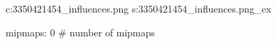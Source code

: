 c:3350421454\textures\hexer_influences.png
s:3350421454\textures\hexer_influences.png_ex

mipmaps: 0  # number of mipmaps
